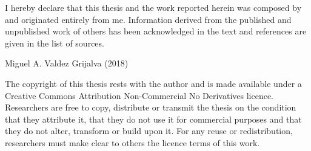 \vspace*{\fill}
\begin{center}
I hereby declare that this thesis and the work reported herein was composed by and originated entirely from me. Information derived from the published and unpublished work of others has been acknowledged in the text and references are given in the list of sources.

\begin{flushright}
Miguel A. Valdez Grijalva (2018)
\end{flushright}
\end{center}
\vspace*{\fill}

The copyright of this thesis rests with the author and is made available under a Creative Commons Attribution Non-Commercial No Derivatives licence. Researchers are free to copy, distribute or transmit the thesis on the condition that they attribute it, that they do not use it for commercial purposes and that they do not alter, transform or build upon it. For any reuse or redistribution, researchers must make clear to others the licence terms of this work.
